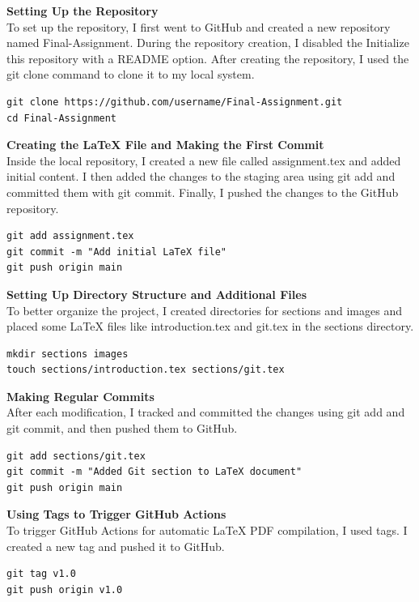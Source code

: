 \documentclass{article}
\begin{document}
\textbf{Setting Up the Repository} \\
To set up the repository, I first went to GitHub and created a new repository named Final-Assignment. During the repository creation, I disabled the Initialize this repository with a README option. After creating the repository, I used the git clone command to clone it to my local system.

\begin{verbatim}
git clone https://github.com/username/Final-Assignment.git
cd Final-Assignment
\end{verbatim}

\textbf{Creating the LaTeX File and Making the First Commit} \\
Inside the local repository, I created a new file called assignment.tex and added initial content. I then added the changes to the staging area using git add and committed them with git commit. Finally, I pushed the changes to the GitHub repository.

\begin{verbatim}
git add assignment.tex
git commit -m "Add initial LaTeX file"
git push origin main
\end{verbatim}

\textbf{Setting Up Directory Structure and Additional Files} \\
To better organize the project, I created directories for sections and images and placed some LaTeX files like introduction.tex and git.tex in the sections directory.

\begin{verbatim}
mkdir sections images
touch sections/introduction.tex sections/git.tex
\end{verbatim}

\textbf{Making Regular Commits} \\
After each modification, I tracked and committed the changes using git add and git commit, and then pushed them to GitHub.

\begin{verbatim}
git add sections/git.tex
git commit -m "Added Git section to LaTeX document"
git push origin main
\end{verbatim}

\textbf{Using Tags to Trigger GitHub Actions} \\
To trigger GitHub Actions for automatic LaTeX PDF compilation, I used tags. I created a new tag and pushed it to GitHub.

\begin{verbatim}
git tag v1.0
git push origin v1.0
\end{verbatim}
\end{document}
